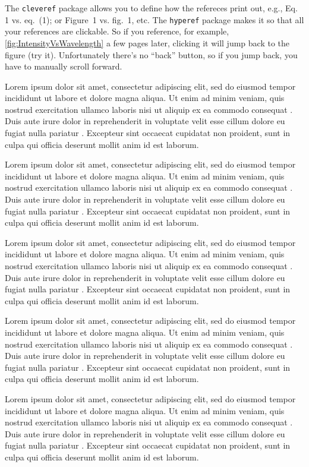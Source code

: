 The \texttt{cleveref} package allows you to define how the refereces print out, e.g., Eq. 1 vs. eq.~(1); or Figure~1 vs. fig.~1, etc.
The \texttt{hyperef} package makes it so that all your references are clickable. 
So if you reference, for example, \cref{fig:IntensityVsWavelength} a few pages later, clicking it will jump back to the figure (try it).
Unfortunately there's no ``back'' button, so if you jump back, you have to manually scroll forward.

Lorem ipsum dolor sit amet, consectetur adipiscing elit, sed do eiusmod tempor incididunt ut labore et dolore magna aliqua. Ut enim ad minim veniam, quis nostrud exercitation ullamco laboris nisi ut aliquip ex ea commodo consequat \cite{ref1}. Duis aute irure dolor in reprehenderit in voluptate velit esse cillum dolore eu fugiat nulla pariatur \cite{ref2}. Excepteur sint occaecat cupidatat non proident, sunt in culpa qui officia deserunt mollit anim id est laborum.

Lorem ipsum dolor sit amet, consectetur adipiscing elit, sed do eiusmod tempor incididunt ut labore et dolore magna aliqua. Ut enim ad minim veniam, quis nostrud exercitation ullamco laboris nisi ut aliquip ex ea commodo consequat \cite{ref1}. Duis aute irure dolor in reprehenderit in voluptate velit esse cillum dolore eu fugiat nulla pariatur \cite{ref2}. Excepteur sint occaecat cupidatat non proident, sunt in culpa qui officia deserunt mollit anim id est laborum.

Lorem ipsum dolor sit amet, consectetur adipiscing elit, sed do eiusmod tempor incididunt ut labore et dolore magna aliqua. Ut enim ad minim veniam, quis nostrud exercitation ullamco laboris nisi ut aliquip ex ea commodo consequat \cite{ref1}. Duis aute irure dolor in reprehenderit in voluptate velit esse cillum dolore eu fugiat nulla pariatur \cite{ref2}. Excepteur sint occaecat cupidatat non proident, sunt in culpa qui officia deserunt mollit anim id est laborum.

Lorem ipsum dolor sit amet, consectetur adipiscing elit, sed do eiusmod tempor incididunt ut labore et dolore magna aliqua. Ut enim ad minim veniam, quis nostrud exercitation ullamco laboris nisi ut aliquip ex ea commodo consequat \cite{ref1}. Duis aute irure dolor in reprehenderit in voluptate velit esse cillum dolore eu fugiat nulla pariatur \cite{ref2}. Excepteur sint occaecat cupidatat non proident, sunt in culpa qui officia deserunt mollit anim id est laborum.

Lorem ipsum dolor sit amet, consectetur adipiscing elit, sed do eiusmod tempor incididunt ut labore et dolore magna aliqua. Ut enim ad minim veniam, quis nostrud exercitation ullamco laboris nisi ut aliquip ex ea commodo consequat \cite{ref1}. Duis aute irure dolor in reprehenderit in voluptate velit esse cillum dolore eu fugiat nulla pariatur \cite{ref2}. Excepteur sint occaecat cupidatat non proident, sunt in culpa qui officia deserunt mollit anim id est laborum.

